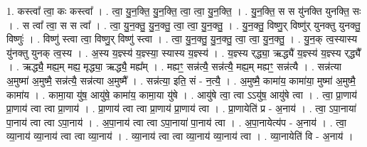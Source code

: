 \documentclass[17pt]{extarticle}
\begin{document}
1. कस्त्वा᳚ त्वा॒ कः कस्त्वा᳚ । . त्वा॒ यु॒न॒क्ति॒ यु॒न॒क्ति॒ त्वा॒ त्वा॒ यु॒न॒क्ति॒ । . यु॒न॒क्ति॒ स स यु॑नक्ति युनक्ति॒ सः । . स त्वा᳚ त्वा॒ स स त्वा᳚ । . त्वा॒ यु॒न॒क्तु॒ यु॒न॒क्तु॒ त्वा॒ त्वा॒ यु॒न॒क्तु॒ । . यु॒न॒क्तु॒ विष्णु॒र् विष्णु॑र् युनक्तु युनक्तु॒ विष्णुः॑ । . विष्णु॑ स्त्वा त्वा॒ विष्णु॒र् विष्णु॑ स्त्वा । . त्वा॒ यु॒न॒क्तु॒ यु॒न॒क्तु॒ त्वा॒ त्वा॒ यु॒न॒क्तु॒ । . यु॒न॒क् त्व॒स्यास्य यु॑नक्तु युनक् त्व॒स्य । . अ॒स्य य॒ज्ञ्स्य॑ य॒ज्ञ्स्या॒ स्यास्य य॒ज्ञ्स्य॑ । . य॒ज्ञ्स्य र्‌द्ध्या॒ ऋद्ध्यै॑ य॒ज्ञ्स्य॑ य॒ज्ञ्स्य र्‌द्ध्यै᳚ । . ऋद्ध्यै॒ मह्य॒म् मह्य॒ मृद्ध्या॒ ऋद्ध्यै॒ मह्य᳚म् । . मह्यꣳ॒॒ सन्न॑त्यै॒ सन्न॑त्यै॒ मह्य॒म् मह्यꣳ॒॒ सन्न॑त्यै । . सन्न॑त्या अ॒मुष्मा॑ अ॒मुष्मै॒ सन्न॑त्यै॒ सन्न॑त्या अ॒मुष्मै᳚ । . सन्न॑त्या॒ इति॒ सं - न॒त्यै॒ । . अ॒मुष्मै॒ कामा॑य॒ कामा॑या॒ मुष्मा॑ अ॒मुष्मै॒ कामा॑य । . कामा॒या यु॑ष॒ आयु॑षे॒ कामा॑य॒ कामा॒या यु॑षे । . आयु॑षे त्वा॒ त्वा ऽऽयु॑ष॒ आयु॑षे त्वा । . त्वा॒ प्रा॒णाय॑ प्रा॒णाय॑ त्वा त्वा प्रा॒णाय॑ । . प्रा॒णाय॑ त्वा त्वा प्रा॒णाय॑ प्रा॒णाय॑ त्वा । . प्रा॒णायेति॑ प्र - अ॒नाय॑ । . त्वा॒ ऽपा॒नाया॑ पा॒नाय॑ त्वा त्वा ऽपा॒नाय॑ । . अ॒पा॒नाय॑ त्वा त्वा ऽपा॒नाया॑ पा॒नाय॑ त्वा । . अ॒पा॒नायेत्य॑प - अ॒नाय॑ । . त्वा॒ व्या॒नाय॑ व्या॒नाय॑ त्वा त्वा व्या॒नाय॑ । . व्या॒नाय॑ त्वा त्वा व्या॒नाय॑ व्या॒नाय॑ त्वा । . व्या॒नायेति॑ वि - अ॒नाय॑ । \newline
\end{document}

